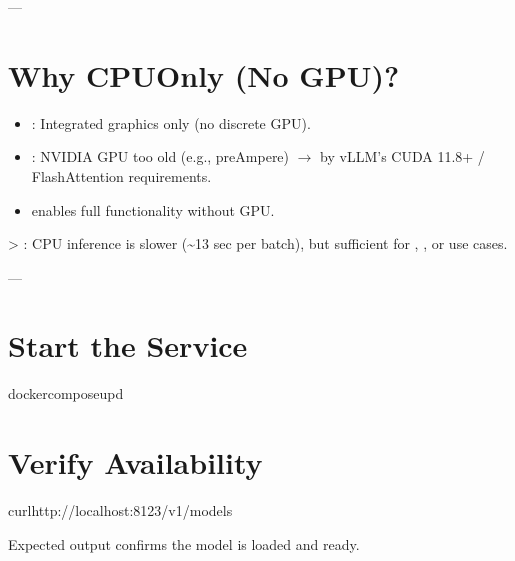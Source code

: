 \documentclass[letterpaper,10pt,english]{sphinxmanual}
\begin{document}
\sphinxAtStartPar
—


\section{Why CPU\sphinxhyphen{}Only (No GPU)?}
\label{\detokenize{vllm-cpu:why-cpu-only-no-gpu}}\begin{itemize}
\item {} 
\sphinxAtStartPar
{}: Integrated graphics only (no discrete GPU).

\item {} 
\sphinxAtStartPar
{}: NVIDIA GPU too old (e.g., pre\sphinxhyphen{}Ampere) \(\rightarrow\)  by vLLM’s CUDA 11.8+ / FlashAttention requirements.

\item {} 
\sphinxAtStartPar
{} enables full functionality without GPU.

\end{itemize}

\sphinxAtStartPar
\textgreater{} : CPU inference is slower (\textasciitilde{}1\textendash{}3 sec per batch), but sufficient for , , or  use cases.

\sphinxAtStartPar
—


\section{Start the Service}
\label{\detokenize{vllm-cpu:start-the-service}}
\begin{sphinxVerbatim}[commandchars=\\\{\}]
docker\PYGZhy{}composeup\PYGZhy{}d
\end{sphinxVerbatim}


\section{Verify Availability}
\label{\detokenize{vllm-cpu:verify-availability}}
\begin{sphinxVerbatim}[commandchars=\\\{\}]
curlhttp://localhost:8123/v1/models
\end{sphinxVerbatim}

\sphinxAtStartPar
Expected output confirms the model is loaded and ready.
\end{document}
